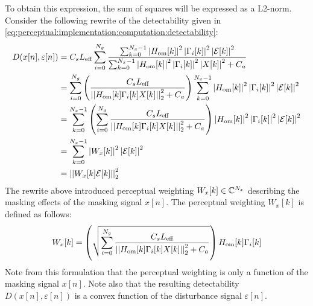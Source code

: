 To obtain this expression, the sum of squares will be expressed as a L2-norm.
Consider the following rewrite of the detectability given in \autoref{eq:perceptual:implementation:computation:detectability}: 
\begin{align*}
    D(x[n],\varepsilon[n]) &= C_s L_\text{eff}\sum_{i=0}^{N_g}
                        \frac{\sum_{k=0}^{N_x-1}\left|H_\text{om}[k]\right|^2\left|
                            \Gamma_i[k]\right|^2\left|\mathcal{E}[k]\right|^2}
                        {\sum_{k=0}^{N_x-1}\left|H_\text{om}[k]\right|^2\left|
                            \Gamma_i[k]\right|^2\left|X[k]\right|^2 + C_a} \\
                           &= \sum_{i=0}^{N_g}
                           \left(\frac{C_s L_\text{eff}}{\norm[2][2]{H_\text{om}[k]\Gamma_i[k]X[k]} + C_a}\right)
                        \sum_{k=0}^{N_x-1}\left|H_\text{om}[k]\right|^2\left|
                        \Gamma_i[k]\right|^2\left|\mathcal{E}[k]\right|^2 \\
                           &= \sum_{k=0}^{N_x-1}\left(\sum_{i=0}^{N_g}\frac{C_s L_\text{eff}}{\norm[2][2]{H_\text{om}[k]\Gamma_i[k]X[k]} + C_a}\right)
                        \left|H_\text{om}[k]\right|^2\left|\Gamma_i[k]\right|^2\left|\mathcal{E}[k]\right|^2 \\
                           &= \sum_{k=0}^{N_x-1}\left|W_x[k]\right|^2\left|\mathcal{E}[k]\right|^2 \\
                           &= \norm[2][2]{W_x[k]\mathcal{E}[k]} 
\end{align*}
The rewrite above introduced perceptual weighting $W_x[k]\in\mathbb{C}^{N_x}$ describing the masking effects of the masking signal $x[n]$. 
The perceptual weighting $W_x[k]$ is defined as follows: 
\begin{equation}
    W_x[k] = \left(\sqrt{\sum_{i=0}^{N_g}\frac{C_s L_\text{eff}}{\norm[2][2]{H_\text{om}[k]\Gamma_i[k]X[k]} + C_a}}\right)
                        H_\text{om}[k]\Gamma_i[k] 
\end{equation}
Note from this formulation that the perceptual weighting is only a function of the masking signal $x[n]$.
Note also that the resulting detectability $D(x[n],\varepsilon[n])$ is a convex function of the disturbance signal $\varepsilon[n]$. 



